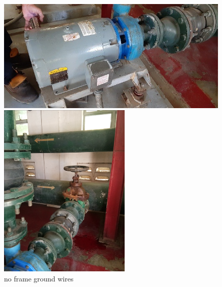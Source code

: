 \begin{figure}[!htb]
	\begin{minipage}[b]{0.3\linewidth}
		\centering
		\includegraphics[width=\textwidth]{figures/fig_ch043_mtrgrounding}
		\caption{no  frame ground wires}
		\label{fig_ch043_mtrgrounding}
	\end{minipage}
	\hspace{0.05cm}
	\begin{minipage}[b]{0.3\linewidth}
		\centering
		\includegraphics[width=\textwidth]{figures/fig_ch043_valve1A}

\end{minipage}
\end{figure}
